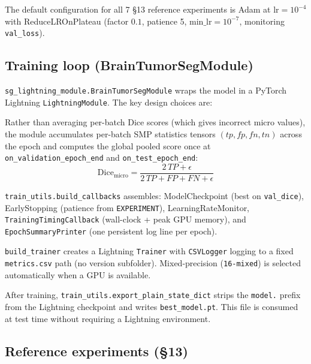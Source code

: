 \documentclass[12pt,a4paper]{article}
\begin{document}
The default configuration for all 7 §13 reference experiments is Adam at
$\text{lr}=10^{-4}$ with ReduceLROnPlateau (factor $0.1$, patience 5,
$\text{min\_lr}=10^{-7}$, monitoring \texttt{val\_loss}).

\subsection{Training loop (BrainTumorSegModule)}

\texttt{sg\_lightning\_module.BrainTumorSegModule} wraps the model in a
PyTorch Lightning \texttt{LightningModule}.  The key design choices are:

\begin{description}[leftmargin=2em]
  \item[Micro metric accumulation.]
    Rather than averaging per-batch Dice scores (which gives incorrect micro
    values), the module accumulates per-batch SMP statistics tensors
    $(tp, fp, fn, tn)$ across the epoch and computes the global pooled score
    once at \texttt{on\_validation\_epoch\_end} and \texttt{on\_test\_epoch\_end}:
    \begin{equation}
      \text{Dice}_\text{micro} = \frac{2\,TP + \epsilon}{2\,TP + FP + FN + \epsilon}
    \end{equation}

  \item[Callbacks.]  \texttt{train\_utils.build\_callbacks} assembles:
    ModelCheckpoint (best on \texttt{val\_dice}), EarlyStopping
    (patience from \texttt{EXPERIMENT}), LearningRateMonitor,
    \texttt{TrainingTimingCallback} (wall-clock + peak GPU memory), and
    \texttt{EpochSummaryPrinter} (one persistent log line per epoch).

  \item[Trainer.]  \texttt{build\_trainer} creates a Lightning \texttt{Trainer}
    with \texttt{CSVLogger} logging to a fixed
    \texttt{metrics.csv} path (no version subfolder).  Mixed-precision
    (\texttt{16-mixed}) is selected automatically when a GPU is available.
\end{description}

After training, \texttt{train\_utils.export\_plain\_state\_dict} strips the
\texttt{model.} prefix from the Lightning checkpoint and writes
\texttt{best\_model.pt}.  This file is consumed at test time without requiring
a Lightning environment.

\subsection{Reference experiments (§13)}
\end{document}

